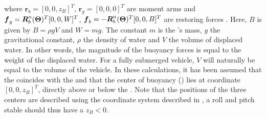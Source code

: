 where $\boldsymbol{r}_b = [0, 0, z_B]^T$, $\boldsymbol{r}_g = [0, 0, 0]^T$ are moment arms and $\boldsymbol{f}_g = \boldsymbol{R}^n_b(\boldsymbol{\Theta})^T [0, 0, W]^T$, $\boldsymbol{f}_b = -\boldsymbol{R}^n_b(\boldsymbol{\Theta})^T [0, 0, B]^T$ are restoring forces \citep[p. 60]{fossen2011}.
Here, $B$ is given by $B = \rho g V$ and $W = m g$. The constant $m$ is the \abbrROV's mass, $g$ the gravitational constant, $\rho$ the density of water and $V$ the volume of displaced water. In other words, the magnitude of the buoyancy forces is equal to the weight of the displaced water. For a fully submerged vehicle, $V$ will naturally be equal to the volume of the vehicle.
In these calculations, it has been assumed that the \abbrCG coincides with the \abbrCO and that the center of buoyancy (\abbrCB) lies at coordinate $[0, 0, z_B]^T$, directly above or below the \abbrCO. Note that the positions of the three centers are described using the coordinate system described in , a roll and pitch stable \abbrROV should thus have a $z_B < 0$.

